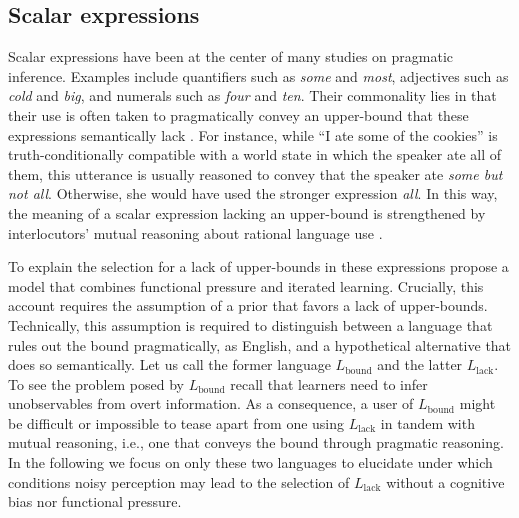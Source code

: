 \documentclass[10pt,a4paper]{article}
\begin{document}
\subsection{Scalar expressions}
Scalar expressions have been at the center of many studies on pragmatic inference. Examples
include quantifiers such as {\em some} and {\em most}, adjectives such as {\em cold} and {\em
  big}, and numerals such as {\em four} and {\em ten}. Their commonality lies in that
their use is often taken to pragmatically convey an upper-bound that these expressions
semantically lack \citep{horn:1972,gazdar:1979}. For instance, while ``I ate some of the
  cookies'' is truth-conditionally compatible with a world state in which the speaker ate
all of them, this utterance is usually reasoned to convey that the speaker ate {\em some but
  not all}. Otherwise, she would have used the stronger expression {\em all}. In this way, the
meaning of a scalar expression lacking an upper-bound is strengthened by interlocutors' mutual reasoning
about rational language use \citep{grice:1975}.

To explain the selection for a lack of upper-bounds in these expressions \citet{brochhagen+etal:2016:CogSci} propose a model that combines functional pressure and iterated learning.  Crucially, this account requires the assumption of a prior that favors a lack of upper-bounds. Technically, this assumption is required to distinguish between a language that rules out the bound pragmatically, as English, and a hypothetical alternative that does so semantically. Let us call the former language $L_{\text{bound}}$ and the latter $L_{\text{lack}}$. To see the problem posed by $L_{\text{bound}}$ recall that learners need to infer unobservables from overt information. As a consequence, a user of $L_{\text{bound}}$ might be difficult or impossible to tease apart from one using $L_{\text{lack}}$ in tandem with mutual reasoning, i.e., one that conveys the bound through pragmatic reasoning. In the following we focus on only these two languages to elucidate under which conditions noisy perception may lead to the selection of $L_{\text{lack}}$ without a cognitive bias nor functional pressure.
\end{document}

